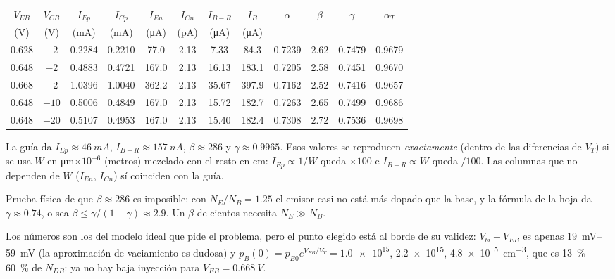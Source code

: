 \documentclass[11pt,a4paper]{article}
\newcommand{\aT}{\alpha_T}
\begin{document}
\begin{clave}
\centering\small
\setlength{\tabcolsep}{3.5pt}
\begin{tabular}{cccccccccccc}
\toprule
$V_{EB}$ & $V_{CB}$ & $I_{Ep}$ & $I_{Cp}$ & $I_{En}$ & $I_{Cn}$ & $I_{B-R}$ & $I_B$ & $\alpha$ & $\beta$ & $\gamma$ & $\aT$\\
(V) & (V) & (mA) & (mA) & (\si{\micro A}) & (pA) & (\si{\micro A}) & (\si{\micro A}) & & & & \\
\midrule
0.628 & $-2$  & 0.2284 & 0.2210 & 77.0  & 2.13 & 7.33  & 84.3  & 0.7239 & 2.62 & 0.7479 & 0.9679\\
0.648 & $-2$  & 0.4883 & 0.4721 & 167.0 & 2.13 & 16.13 & 183.1 & 0.7205 & 2.58 & 0.7451 & 0.9670\\
0.668 & $-2$  & 1.0396 & 1.0040 & 362.2 & 2.13 & 35.67 & 397.9 & 0.7162 & 2.52 & 0.7416 & 0.9657\\
\midrule
0.648 & $-10$ & 0.5006 & 0.4849 & 167.0 & 2.13 & 15.72 & 182.7 & 0.7263 & 2.65 & 0.7499 & 0.9686\\
0.648 & $-20$ & 0.5107 & 0.4953 & 167.0 & 2.13 & 15.40 & 182.4 & 0.7308 & 2.72 & 0.7536 & 0.9698\\
\bottomrule
\end{tabular}
\end{clave}

\begin{ojo}
La guía da $I_{Ep}\approx\SI{46}{mA}$, $I_{B-R}\approx\SI{157}{nA}$, $\beta\approx286$ y
$\gamma\approx0.9965$. Esos valores se reproducen \emph{exactamente} (dentro de las diferencias
de $V_T$) si se usa $W$ en \si{\micro m}$\times10^{-6}$ (metros) mezclado con el resto en
\si{cm}: $I_{Ep}\propto1/W$ queda $\times100$ e $I_{B-R}\propto W$ queda $/100$.
Las columnas que no dependen de $W$ ($I_{En}$, $I_{Cn}$) sí coinciden con la guía.

Prueba física de que $\beta\approx286$ es imposible: con $N_E/N_B=1.25$ el emisor casi no está más
dopado que la base, y la fórmula de la hoja da $\gamma\approx0.74$, o sea
$\beta\le\gamma/(1-\gamma)\approx2.9$. Un $\beta$ de cientos necesita $N_E\gg N_B$.
\end{ojo}

\begin{ojo}
Los números son los del modelo ideal que pide el problema, pero el punto elegido está al borde
de su validez:
$V_{bi}-V_{EB}$ es apenas \SIrange{19}{59}{mV} (la aproximación de vaciamiento es dudosa) y
$p_B(0)=p_{B0}e^{V_{EB}/V_T}=\num{1.0e15}$, \num{2.2e15}, \SI{4.8e15}{cm^{-3}}, que es
\SIrange{13}{60}{\percent} de $N_{DB}$: ya no hay baja inyección para $V_{EB}=\SI{0.668}{V}$.
\end{ojo}
\end{document}
